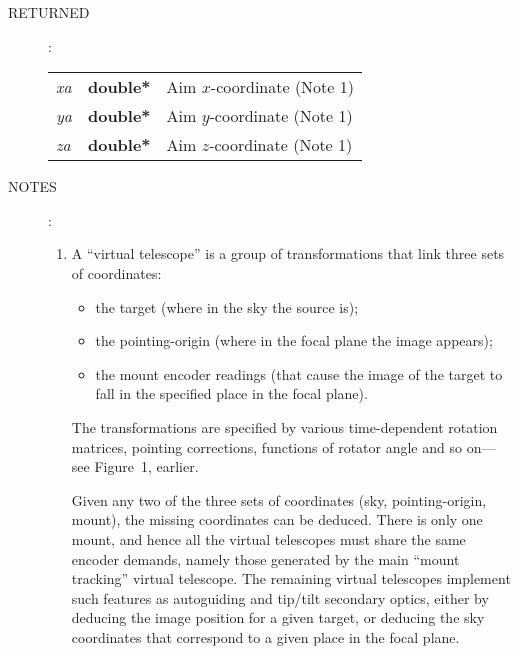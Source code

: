 \documentclass[12pt,fleqn,twoside]{article}
\renewcommand{\_}{{\tt\char'137}}     %
\newcommand{\args}[2]
{
  \goodbreak
  \begin{description}
  \item[#1]: \\[1.5ex] \nopagebreak
    \hspace*{-0.9em}
    \begin{tabular}{p{4.5em}p{5.8em}p{23.5em}}
      #2
    \end{tabular}
  \end{description}
  \vspace{-3ex}
}
\newcommand{\spec}[3]
{
  {\em {#1}} & {\bf \mbox{#2}} & {#3}
}
\newcommand{\notes}[1]
{
  \goodbreak
  \begin{description}
    \item[NOTES]: \nopagebreak
        #1
  \end{description}
  \vspace{-3ex}
}
\begin{document}
\args{RETURNED}
{
\spec{xa}{double*}{{\sc Aim} $x$-coordinate (Note 1)} \\
\spec{ya}{double*}{{\sc Aim} $y$-coordinate (Note 1)} \\
\spec{za}{double*}{{\sc Aim} $z$-coordinate (Note 1)}
}
\notes{
\begin{enumerate}
\setlength{\parskip}{\medskipamount}
\item A ``virtual telescope'' is a group of transformations that link
      three sets of coordinates:
      \begin{itemize}
      \item the target (where in the sky the source is);
      \item the pointing-origin (where in the focal plane the image
            appears);
      \item the mount encoder readings (that cause the image of the
            target to fall in the specified place in the focal plane).
      \end{itemize}
      The transformations are specified by various time-dependent
      rotation matrices, pointing corrections, functions of rotator
      angle and so on---see Figure~1, earlier.

      Given any two of the three sets of coordinates
      (sky, pointing-origin, mount), the missing coordinates
      can be deduced.  There is
      only one mount, and hence all the virtual telescopes must share
      the same encoder demands, namely those generated by the main
      ``mount tracking'' virtual telescope.  The remaining virtual
      telescopes implement such features as autoguiding and tip/tilt
      secondary optics, either by deducing the image position for a
      given target, or deducing the sky coordinates that correspond to
      a given place in the focal plane.


\end{enumerate}}
\end{document}
